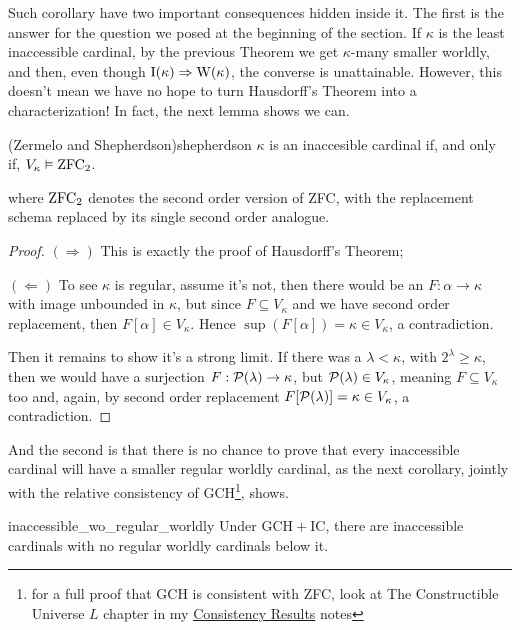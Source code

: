 Such corollary have two important consequences hidden inside it. The first is the answer for the question we posed at the beginning of the section. If $\kappa$ is the least inaccessible cardinal, by the previous Theorem we get $\kappa$-many smaller worldly, and then, even though $\mathrm{I}\!\left(\kappa\right)\Rightarrow\mathrm{W}\!\left(\kappa\right)$, the converse is unattainable. However, this doesn't mean we have no hope to turn Hausdorff's Theorem into a characterization! In fact, the next lemma shows we can.

\begin{lemma}{(Zermelo and Shepherdson)}{shepherdson}
    $\kappa$ is an inaccesible cardinal if, and only if, $V_\kappa\vDash\mathrm{ZFC}_2$.
\end{lemma}
where $\mathrm{ZFC}_2$ denotes the second order version of ZFC, with the replacement schema replaced by its single second order analogue.

\begin{proof}
    $(\Rightarrow)$ This is exactly the proof of Hausdorff's Theorem;

    $(\Leftarrow)$ To see $\kappa$ is regular, assume it's not, then there would be an $F:\alpha\to\kappa$ with image unbounded in $\kappa$, but since $F\subseteq V_\kappa$ and we have second order replacement, then $F[\alpha]\in V_\kappa$. Hence $\sup(F[\alpha])=\kappa\in V_\kappa$, a contradiction.

    Then it remains to show it's a strong limit. If there was a $\lambda<\kappa$, with $2^\lambda\geq\kappa$, then we would have a surjection $F:\mathcal{P}(\lambda)\to\kappa$, but $\mathcal{P}(\lambda)\in V_\kappa$, meaning $F\subseteq V_\kappa$ too and, again, by second order replacement $F[\mathcal{P}(\lambda)]=\kappa\in V_\kappa$, a contradiction.
\end{proof}

And the second is that there is no chance to prove that every inaccessible cardinal will have a smaller regular worldly cardinal, as the next corollary, jointly with the relative consistency of GCH\footnote{for a full proof that GCH is consistent with ZFC, look at The Constructible Universe $L$ chapter in my \href{https://github.com/Xennonio/Consistency-Results}{Consistency Results} notes}, shows.

\begin{corollary}{}{inaccessible_wo_regular_worldly}
    Under $\mathrm{GCH}+\mathrm{IC}$, there are inaccessible cardinals with no regular worldly cardinals below it.
\end{corollary}

